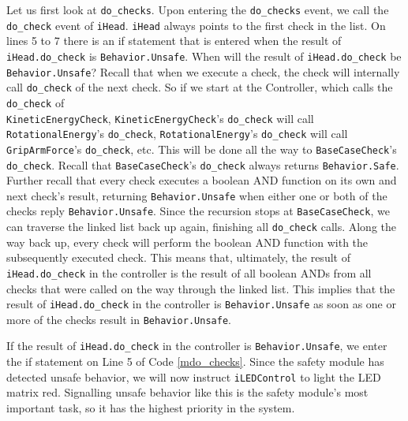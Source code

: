 \documentclass[12pt]{scrreprt}
\begin{document}
Let us first look at \texttt{do\_checks}. Upon entering the \texttt{do\_checks} event, we call the \texttt{do\_check} event of \texttt{iHead}. \texttt{iHead} always points to the first check in the list. On lines 5 to 7 there is an if statement that is entered when the result of \texttt{iHead.do\_check} is \texttt{Behavior.Unsafe}. When will the result of \texttt{iHead.do\_check} be \texttt{Behavior.Unsafe}? Recall that when we execute a check, the check will internally call \texttt{do\_check} of the next check. So if we start at the Controller, which calls the \texttt{do\_check} of\\\texttt{KineticEnergyCheck}, \texttt{KineticEnergyCheck}'s \texttt{do\_check} will call \texttt{RotationalEnergy}'s \texttt{do\_check}, \texttt{RotationalEnergy}'s \texttt{do\_check} will call \texttt{GripArmForce}'s \texttt{do\_check}, etc. This will be done all the way to \texttt{BaseCaseCheck}'s \texttt{do\_check}. Recall that \texttt{BaseCaseCheck}'s \texttt{do\_check} always returns \texttt{Behavior.Safe}. Further recall that every check executes a boolean AND function on its own and next check's result, returning \texttt{Behavior.Unsafe} when either one or both of the checks reply \texttt{Behavior.Unsafe}. Since the recursion stops at \texttt{BaseCaseCheck}, we can traverse the linked list back up again, finishing all \texttt{do\_check} calls. Along the way back up, every check will perform the boolean AND function with the subsequently executed check. This means that, ultimately, the result of \texttt{iHead.do\_check} in the controller is the result of all boolean ANDs from all checks that were called on the way through the linked list. This implies that the result of \texttt{iHead.do\_check} in the controller is \texttt{Behavior.Unsafe} as soon as one or more of the checks result in \texttt{Behavior.Unsafe}.
\par
If the result of \texttt{iHead.do\_check} in the controller is \texttt{Behavior.Unsafe}, we enter the if statement on Line 5 of Code \ref{mdo_checks}. Since the safety module has detected unsafe behavior, we will now instruct \texttt{iLEDControl} to light the LED matrix red. Signalling unsafe behavior like this is the safety module's most important task, so it has the highest priority in the system.
\par
\end{document}
